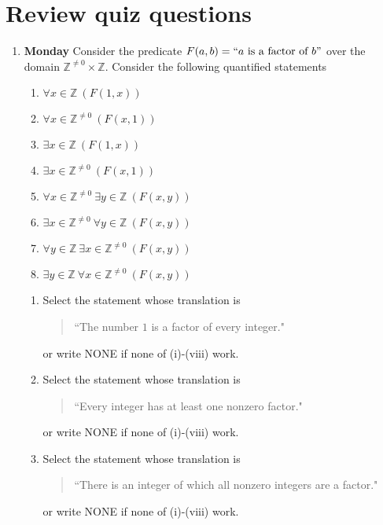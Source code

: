 \documentclass[12pt, oneside]{article}
\begin{document}
\section*{Review quiz questions}
\begin{enumerate}

\item {\bf Monday} Consider the predicate  $F(a,b)  = ``a \text{ is a factor of } b"$ over  the domain $\mathbb{Z}^{\neq 0} \times \mathbb{Z}$. Consider the following quantified
statements
\begin{multicols}{2}
\begin{enumerate}[label=(\roman*)]
\item $\forall x \in \mathbb{Z} ~(F(1,x))$
\item $\forall x \in \mathbb{Z}^{\neq 0} ~(F(x,1))$
\item $\exists x \in \mathbb{Z} ~(F(1,x))$
\item $\exists x \in \mathbb{Z}^{\neq 0} ~(F(x,1))$
\item $\forall x \in \mathbb{Z}^{\neq 0} ~\exists y \in \mathbb{Z} ~(F(x,y))$
\item $\exists x \in \mathbb{Z}^{\neq 0} ~\forall y \in \mathbb{Z} ~(F(x,y))$
\item $\forall y \in \mathbb{Z} ~\exists x \in \mathbb{Z}^{\neq 0} ~(F(x,y))$
\item $\exists y \in \mathbb{Z} ~\forall x \in \mathbb{Z}^{\neq 0} ~(F(x,y))$
\end{enumerate}
\end{multicols}
\begin{enumerate}
\item Select the statement whose translation is
\begin{quote}
``The number $1$ is  a factor of every integer."
\end{quote}
or write NONE if none of (i)-(viii) work.

\item Select the statement whose translation is
\begin{quote}
``Every integer has at least one nonzero factor."
\end{quote}
or write NONE if none of (i)-(viii) work.

\item Select the statement whose translation is
\begin{quote}
``There is an integer of which
all nonzero integers are a factor."
\end{quote}
or write NONE if none of (i)-(viii) work.


\end{enumerate}
\end{enumerate}
\end{document}
